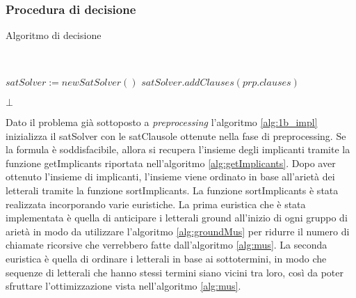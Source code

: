 \documentclass[./main.tex]{subfiles}
\begin{document}
\subsubsection{Procedura di decisione}

\begin{algorithm}[H] \label{alg:1b_impl}
    \caption{Algoritmo di decisione}
    \\

$satSolver := newSatSolver()$\;
$satSolver.addClauses(prp.clauses)$\;

\Return $\bot$\;
\end{algorithm}

Dato il problema già sottoposto a \textit{preprocessing} l'algoritmo \ref{alg:1b_impl} inizializza il satSolver
con le satClausole ottenute nella fase di preprocessing. 
Se la formula è soddisfacibile, allora si recupera l'insieme degli implicanti
tramite la funzione getImplicants riportata nell'algoritmo \ref{alg:getImplicants}.
Dopo aver ottenuto l'insieme di implicanti, l'insieme viene ordinato in base all'arietà dei letterali tramite la funzione sortImplicants.
La funzione sortImplicants è stata realizzata incorporando varie euristiche.
La prima euristica che è stata implementata è quella di anticipare i letterali ground all'inizio di ogni gruppo di arietà in modo da utilizzare 
l'algoritmo \ref{alg:groundMus} per ridurre il numero di chiamate ricorsive che verrebbero fatte dall'algoritmo \ref{alg:mus}.
La seconda euristica è quella di ordinare i letterali in base ai sottotermini, in modo che sequenze di letterali
che hanno stessi termini siano vicini tra loro, così da poter sfruttare l'ottimizzazione vista nell'algoritmo \ref{alg:mus}.
\end{document}
